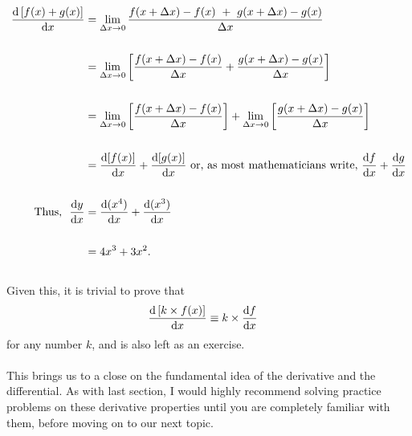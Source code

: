 \documentclass[11pt]{article}
\numberwithin{equation}{section}
\begin{document}
\begin{align*}
	\frac{\textrm{d}\left[ f(x) + g(x) \right]}{\textrm{d}x} &= \lim_{\Delta x \to 0} \frac{f(x + \Delta x) - f(x) \ + \  g(x + \Delta x) - g(x)}{\Delta x} \\ \\
	&= \lim_{\Delta x \to 0} \left[ \frac{f(x + \Delta x) - f(x)}{\Delta x} + \frac{g(x + \Delta x) - g(x)}{\Delta x} \right] \\ \\
	&= \lim_{\Delta x \to 0} \left[ \frac{f(x + \Delta x) - f(x)}{\Delta x} \right] + \lim_{\Delta x \to 0} \left[ \frac{g(x + \Delta x) - g(x)}{\Delta x} \right] \\ \\
	&= \frac{\textrm{d}[f(x)]}{\textrm{d}x} + \frac{\textrm{d}[g(x)]}{\textrm{d}x} \ \textrm{or, as most mathematicians write, } \frac{\textrm{d}f}{\textrm{d}x} + \frac{\textrm{d}g}{\textrm{d}x} \\ \\
	\textrm{Thus, } \ \frac{\textrm{d}y}{\textrm{d}x} &= \frac{\textrm{d}(x^4)}{\textrm{d}x} + \frac{\textrm{d}(x^3)}{\textrm{d}x} \\ \\ &= 4x^3 + 3x^2.
\end{align*}
\\ Given this, it is trivial to prove that 
\begin{align*}
	\frac{\textrm{d}\, [k \times f(x)]}{\textrm{d}x} & \equiv k \times \frac{\textrm{d}f}{\textrm{d}x}
\end{align*}
for any number \(k\), and is also left as an exercise.
\\ \\ This brings us to a close on the fundamental idea of the derivative and the differential. As with last section, I would highly recommend solving practice problems on these derivative properties until you are completely familiar with them, before moving on to our next topic.
\end{document}
